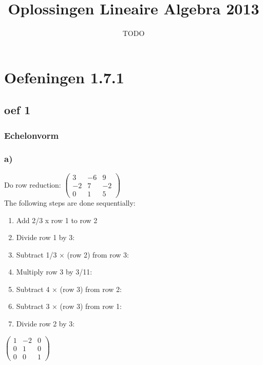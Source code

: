\documentclass[10pt,a4paper]{article}
\title{Oplossingen Lineaire Algebra 2013}
\author{TODO}
\begin{document}
\maketitle
\pagebreak
\tableofcontents
\pagebreak


\section{Oefeningen 1.7.1}
\subsection*{oef 1}
\subsubsection*{Echelonvorm}
\subsubsection*{a)}
Do row reduction:
$\begin{pmatrix}
3 & -6 & 9\\
-2 & 7 & -2\\
0 & 1 & 5
\end{pmatrix}
$
\\
The following steps are done sequentially:

\begin{enumerate}
\item Add 2/3 x row 1 to row 2
\item Divide row 1 by 3:
\item Subtract 1/3 × (row 2) from row 3:
\item Multiply row 3 by 3/11:
\item Subtract 4 × (row 3) from row 2:
\item Subtract 3 × (row 3) from row 1:
\item Divide row 2 by 3:
\end{enumerate}

$
\begin{pmatrix}
1 & -2 & 0\\
0 & 1 & 0\\
0 & 0 & 1
\end{pmatrix}
$
\end{document}
